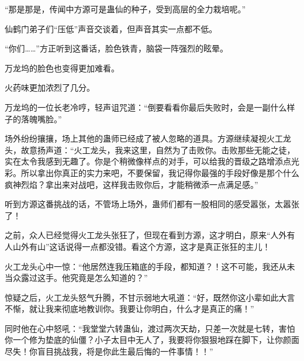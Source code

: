 \begin{this_body}
“那是那是，传闻中方源可是蛊仙的种子，受到高层的全力栽培呢。”

仙鹤门弟子们“压低”声音交谈着，但声音其实一点都不低。

“你们……”方正听到这番话，脸色铁青，脑袋一阵强烈的眩晕。

万龙坞的脸色也变得更加难看。

火药味更加浓烈了几分。

万龙坞的一位长老冷哼，轻声诅咒道：“倒要看看你最后失败时，会是一副什么样子的落魄嘴脸。”

场外纷纷攘攘，场上其他的蛊师已经成了被人忽略的道具。方源继续凝视火工龙头，故意扬声道：“火工龙头，我来这里，自然为了击败你。击败那些无能之徒，实在太令我感到无趣了。你是个稍微像样点的对手，可以给我的晋级之路增添点光彩。所以拿出你真正的实力来吧，不要保留，我记得你最强的手段好像是那个什么疯神烈焰？拿出来对战吧，这样我击败你后，才能稍微添一点满足感。”

听到方源这番挑战的话，不管场上场外，蛊师们都有一股相同的感受嚣张，太嚣张了！

之前，众人已经觉得火工龙头张狂了，但现在看到方源，这才明白，原来“人外有人山外有山”这话说得一点都没错。看这个方源，这才是真正张狂的主儿！

火工龙头心中一惊：“他居然连我压箱底的手段，都知道？！这不可能，我还从未当众露过这手。他究竟是怎么知道的？”

惊疑之后，火工龙头怒气升腾，不甘示弱地大吼道：“好，既然你这小辈如此大言不惭，就让我来彻底地教训你。我要让你明白，什么才是真正的痛！”

同时他在心中怒吼：“我堂堂六转蛊仙，渡过两次天劫，只差一次就是七转，害怕你一个修为垫底的仙僵？小子太目中无人了，我要将你狠狠地踩在脚下，让你颜面尽失！你盲目挑战我，将是你此生最后悔的一件事情！！”

\end{this_body}


